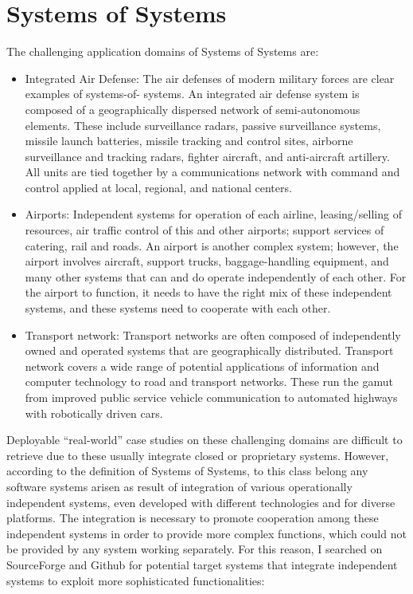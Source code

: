 \chapter{Systems of Systems}\label{ch:SoS}
The challenging application domains of Systems of Systems are:
\begin{itemize}
  \item Integrated Air Defense: The air defenses of modern military forces are
  clear examples of systems-of- systems. An integrated air defense system is composed of a geographically dispersed network of semi-autonomous elements. These include surveillance radars, passive surveillance systems, missile launch batteries, missile tracking and control sites, airborne surveillance and tracking radars, fighter aircraft, and anti-aircraft artillery. All units are tied together by a communications network with command and control applied at local, regional, and national centers.
  
  \item Airports: Independent systems for operation of each airline,
  leasing/selling of resources, air traffic control of this and other airports; support services of catering, rail and roads. An airport is another complex system; however, the airport involves aircraft, support trucks, baggage-handling equipment, and many other systems that can and do operate independently of each other. For the airport to function, it needs to have the right mix of these independent systems, and these systems need to cooperate with each other.
  
  \item Transport network: Transport networks are often composed of independently
  owned and operated systems that are geographically distributed.  Transport network covers a wide range of potential applications of information and computer technology to road and transport networks. These run the gamut from improved public service vehicle communication to automated highways with robotically driven cars.
\end{itemize}

Deployable ``real-world'' case studies on these challenging domains are difficult to
retrieve due to these usually integrate closed or proprietary systems.
However, according to the definition of Systems of Systems, to this class belong
any software systems arisen as result of integration of various operationally independent
systems, even developed with different technologies and for diverse platforms.
The integration is necessary to promote cooperation among these independent
systems in order to provide more complex functions, which could not be provided
by any system working separately.
For this reason, I searched on SourceForge and Github for potential target
systems that integrate independent systems to exploit more sophisticated
functionalities:


